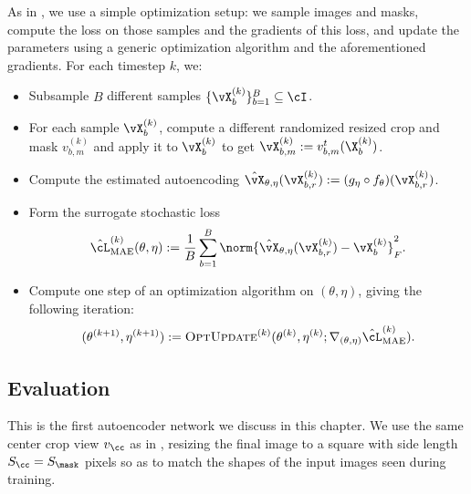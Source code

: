 \documentclass[../../book-main.tex]{subfiles}
\begin{document}
As in , we use a simple optimization setup: we sample images and masks, compute the loss on those samples and the gradients of this loss, and update the parameters using a generic optimization algorithm and the aforementioned gradients. For each timestep \(k\), we:
\begin{itemize}
    \item Subsample \(B\) different samples \(\{\vX_{b}^{(k)}\}_{b = 1}^{B} \subseteq \cI\).
    \item For each sample \(\vX_{b}^{(k)}\), compute a different randomized resized crop and mask \(v_{b, m}^{(k)}\) and apply it to \(\vX_{b}^{(k)}\) to get \(\vX_{b, m}^{(k)} := v_{b, m}^{t}(\X_{b}^{(k)})\).
    \item Compute the estimated autoencoding \(\hat{\vX}_{\theta, \eta}(\vX_{b, r}^{(k)}) := (g_{\eta} \circ f_{\theta})(\vX_{b, r}^{(k)})\).
    \item Form the surrogate stochastic loss 
    \begin{equation}
        \hat{\cL}_{\mathrm{MAE}}^{(k)}(\theta, \eta) := \frac{1}{B}\sum_{b = 1}^{B}\norm{\hat{\vX}_{\theta, \eta}(\vX_{b, r}^{(k)}) - \vX_{b}^{(k)}}_{F}^{2}.
    \end{equation}
    \item Compute one step of an optimization algorithm on \((\theta, \eta)\), giving the following iteration:
    \begin{equation}
        (\theta^{(k + 1)}, \eta^{(k + 1)}) := \textsc{OptUpdate}^{(k)}(\theta^{(k)}, \eta^{(k)}; \nabla_{(\theta, \eta)}\hat{\cL}_{\mathrm{MAE}}^{(k)}).
    \end{equation}
\end{itemize}

\subsection{Evaluation} \label{sub:image_completion_optimization_1}

This is the first autoencoder network we discuss in this chapter. We use the same center crop view \(v_{\cc}\) as in , resizing the final image to a square with side length \(S_{\cc} = S_{\mask}\) pixels so as to match the shapes of the input images seen during training. 
\end{document}

